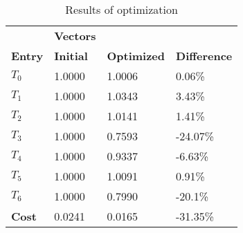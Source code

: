 \begin{table}[h!]
\centering
\begin{tabular}{llll}
\textbf{}      & \cellcolor[HTML]{EFEFEF}\textbf{Vectors} & \textbf{} & \textbf{}         \\
\rowcolor[HTML]{EFEFEF} 
\textbf{Entry} & \textbf{Initial} & \textbf{Optimized} & \textbf{Difference} \\
$T_0$ & 1.0000 & 1.0006 & 0.06\% \\ 
$T_1$ & 1.0000 & 1.0343 & 3.43\% \\ 
$T_2$ & 1.0000 & 1.0141 & 1.41\% \\ 
$T_3$ & 1.0000 & 0.7593 & -24.07\% \\ 
$T_4$ & 1.0000 & 0.9337 & -6.63\% \\ 
$T_5$ & 1.0000 & 1.0091 & 0.91\% \\ 
$T_6$ & 1.0000 & 0.7990 & -20.1\% \\ 
\rowcolor[HTML]{EFEFEF} 
\textbf{Cost}  & 0.0241 & 0.0165 & -31.35\% \\ 
\end{tabular}
\caption{Results of optimization}
\label{tab:OptimizationAnalysis}
\end{table}